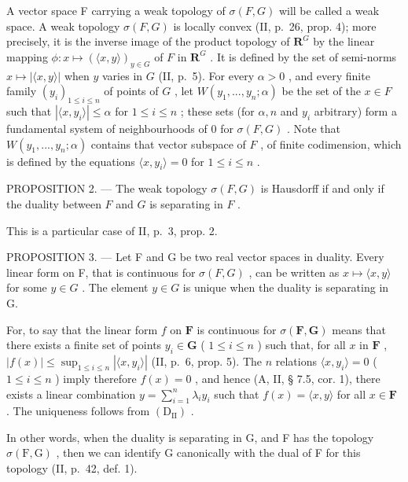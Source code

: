 A vector space F carrying a weak topology of \(\sigma(F, G)\) will be called a weak space. A weak topology \(\sigma(F, G)\) is locally convex (II, p.~26, prop. 4); more precisely, it is the inverse image of the product topology of \(\mathbf{R}^G\) by the linear mapping \(\phi: x \mapsto (\langle x, y \rangle)_{y \in G}\) of \(F\) in \(\mathbf{R}^G\) . It is defined by the set of semi-norms \(x \mapsto |\langle x, y \rangle|\) when \(y\) varies in \(G\) (II, p.~5). For every \(\alpha > 0\) , and every finite family \((y_i)_{1 \leq i \leq n}\) of points of \(G\) , let \(W(y_1, ..., y_n; \alpha)\) be the set of the \(x \in F\) such that \(|\langle x, y_i \rangle| \leqslant \alpha\) for \(1 \leq i \leq n\) ; these sets (for \(\alpha, n\) and \(y_i\) arbitrary) form a fundamental system of neighbourhoods of 0 for \(\sigma(F, G)\) . Note that \(W(y_1, ..., y_n; \alpha)\) contains that vector subspace of \(F\) , of finite codimension, which is defined by the equations \(\langle x, y_i \rangle = 0\) for \(1 \leq i \leq n\) .

PROPOSITION 2. --- The weak topology \(\sigma(F, G)\) is Hausdorff if and only if the duality between \(F\) and \(G\) is separating in \(F\) .

This is a particular case of II, p.~3, prop. 2.

PROPOSITION 3. --- Let F and G be two real vector spaces in duality. Every linear form on F, that is continuous for \(\sigma(F, G)\) , can be written as \(x \mapsto \langle x, y \rangle\) for some \(y \in G\) . The element \(y \in G\) is unique when the duality is separating in G.

For, to say that the linear form \(f\) on \(\mathbf{F}\) is continuous for \(\sigma(\mathbf{F}, \mathbf{G})\) means that there exists a finite set of points \(y_i \in \mathbf{G}\) ( \(1 \leqslant i \leqslant n\) ) such that, for all \(x\) in \(\mathbf{F}\) , \(|f(x)| \leqslant \sup_{1 \leqslant i \leqslant n} |\langle x, y_i \rangle|\) (II, p.~6, prop. 5). The \(n\) relations \(\langle x, y_i \rangle = 0\) ( \(1 \leqslant i \leqslant n\) ) imply therefore \(f(x) = 0\) , and hence (A, II, § 7.5, cor. 1), there exists a linear combination \(y = \sum_{i=1}^{n} \lambda_i y_i\) such that \(f(x) = \langle x, y \rangle\) for all \(x \in \mathbf{F}\) . The uniqueness follows from \((\mathrm{D}_{\mathrm{II}})\) .

In other words, when the duality is separating in G, and F has the topology \(\sigma(\mathrm{F}, \mathrm{G})\) , then we can identify G canonically with the dual of F for this topology (II, p.~42, def. 1).

